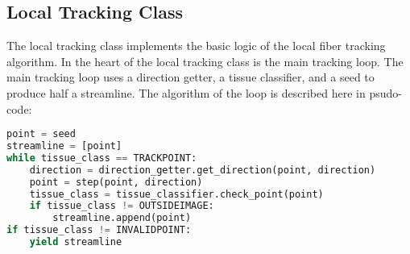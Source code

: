 \subsection{Local Tracking Class}
    The local tracking class implements the basic logic of the local fiber tracking algorithm. In the heart of the local tracking class is the main tracking loop. The main tracking loop uses a direction getter, a tissue classifier, and a seed to produce half a streamline. The algorithm of the loop is described here in psudo-code:
\begin{lstlisting}[language=python]
point = seed
streamline = [point]
while tissue_class == TRACKPOINT:
    direction = direction_getter.get_direction(point, direction)
    point = step(point, direction)
    tissue_class = tissue_classifier.check_point(point)
    if tissue_class != OUTSIDEIMAGE:
        streamline.append(point)
if tissue_class != INVALIDPOINT:
    yield streamline
\end{lstlisting}